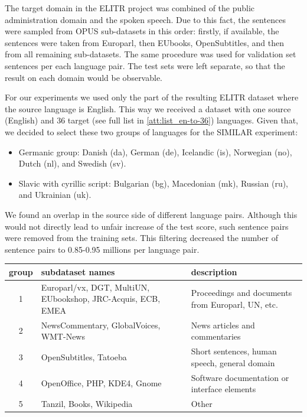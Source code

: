 The target domain in the ELITR project was combined of the public administration
domain and the spoken speech.
Due to this fact, the sentences were sampled from OPUS sub-datasets in this order:
firstly, if available, the sentences were taken from Europarl,
then EUbooks, OpenSubtitles, and then from all remaining sub-datasets.
The same procedure was used for validation set sentences per each language pair.
The test sets were left separate, so that the result on each domain would be observable.

For our experiments we used only the part of the resulting ELITR dataset where
the source language is English.
This way we received a dataset with one source (English) and 36 target 
(see full list in \cref{att:list_en-to-36}) languages.
Given that,
we decided to select these two groups of languages for the SIMILAR experiment:
\begin{itemize}
	\item Germanic group: Danish (da), German (de), Icelandic (is),
	Norwegian (no), Dutch (nl), and Swedish (sv).
	\item Slavic with cyrillic script: Bulgarian (bg), Macedonian (mk),
	Russian (ru), and Ukrainian (uk).
\end{itemize}



We found an overlap in the source side of different language pairs.
Although this would not directly lead to unfair increase of the test score,
such sentence pairs were removed from the training sets.
This filtering decreased the number of sentence pairs
to 0.85-0.95 millions per language pair.


\begin{table}[h!]
	\centering
	\begin{tabular}{c|p{}|p{}}
	\toprule
	     group & subdataset names  & description \\
	\midrule
	 1 &  Europarl/vx, DGT, MultiUN, EUbookshop, JRC-Acquis,
	      ECB, EMEA
	   &  Proceedings and documents from Europarl, UN, etc. \\
	 2 &  NewsCommentary, GlobalVoices, WMT-News 
	   &  News articles and commentaries \\
	 3 &  OpenSubtitles, Tatoeba
	   &  Short sentences, human speech, general domain \\
	 4 &  OpenOffice, PHP, KDE4, Gnome
	   &  Software documentation or interface elements \\
	 5 &  Tanzil, Books, Wikipedia
	   &  Other  \\
	\bottomrule
	\end{tabular}

	\label{tab:subdatasets_groups}
\end{table}

